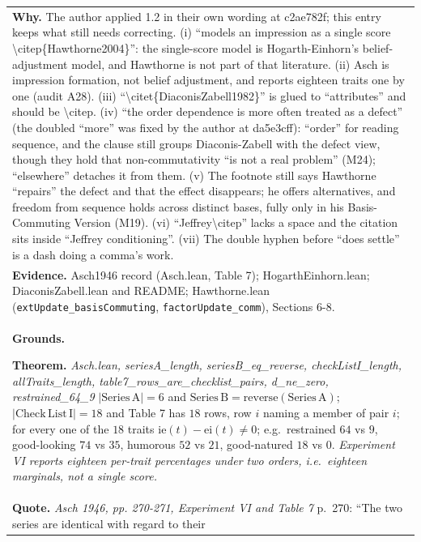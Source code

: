 \documentclass[10pt]{article}
\theoremstyle{definition}
\newlength{\fullw}\setlength{\fullw}{25.9cm}
\begin{document}
{\begin{longtable}{|p{0.9cm}|p{12.2cm}|p{12.2cm}|}
\multicolumn{3}{|p{\fullw}|}{\textbf{Why.} The author applied 1.2 in their own wording at c2ae782f; this entry keeps what still needs correcting. (i) ``models an impression as a single score \textbackslash{}citep\{Hawthorne2004\}'': the single-score model is Hogarth-Einhorn's belief-adjustment model, and Hawthorne is not part of that literature. (ii) Asch is impression formation, not belief adjustment, and reports eighteen traits one by one (audit A28). (iii) ``\textbackslash{}citet\{DiaconisZabell1982\}'' is glued to ``attributes'' and should be \textbackslash{}citep. (iv) ``the order dependence is more often treated as a defect'' (the doubled ``more'' was fixed by the author at da5e3cff): ``order'' for reading sequence, and the clause still groups Diaconis-Zabell with the defect view, though they hold that non-commutativity ``is not a real problem'' (M24); ``elsewhere'' detaches it from them. (v) The footnote still says Hawthorne ``repairs'' the defect and that the effect disappears; he offers alternatives, and freedom from sequence holds across distinct bases, fully only in his Basis-Commuting Version (M19). (vi) ``Jeffrey\textbackslash{}citep'' lacks a space and the citation sits inside ``Jeffrey conditioning''. (vii) The double hyphen before ``does settle'' is a dash doing a comma's work.} \\
\multicolumn{3}{|p{\fullw}|}{\textbf{Evidence.} Asch1946 record (Asch.lean, Table 7); HogarthEinhorn.lean; DiaconisZabell.lean and README; Hawthorne.lean (\texttt{extUpdate\_basisCommuting}, \texttt{factorUpdate\_comm}), Sections 6-8.} \\ \hline
\multicolumn{3}{|p{\fullw}|}{\textbf{Grounds.}\par \textbf{Theorem.} \textit{Asch.lean, seriesA\_length, seriesB\_eq\_reverse, checkListI\_length, allTraits\_length, table7\_rows\_are\_checklist\_pairs, d\_ne\_zero, restrained\_64\_9} \newline $|\mathrm{Series\,A}| = 6$ and $\mathrm{Series\,B} = \mathrm{reverse}(\mathrm{Series\,A})$;
$|\mathrm{Check\,List\,I}| = 18$ and Table 7 has $18$ rows, row $i$ naming a member
of pair $i$; for every one of the $18$ traits
$\mathrm{ie}(t) - \mathrm{ei}(t) \neq 0$; e.g.\ restrained $64$ vs $9$,
good-looking $74$ vs $35$, humorous $52$ vs $21$, good-natured $18$ vs $0$. \newline \textit{Experiment VI reports eighteen per-trait percentages under two
orders, i.e.\ eighteen marginals, not a single score.}} \\
\multicolumn{3}{|p{\fullw}|}{\textbf{Quote.} \textit{Asch 1946, pp. 270-271, Experiment VI and Table 7} \newline p.~270: ``The two series are identical with regard to their
}
\end{longtable}}
\end{document}
